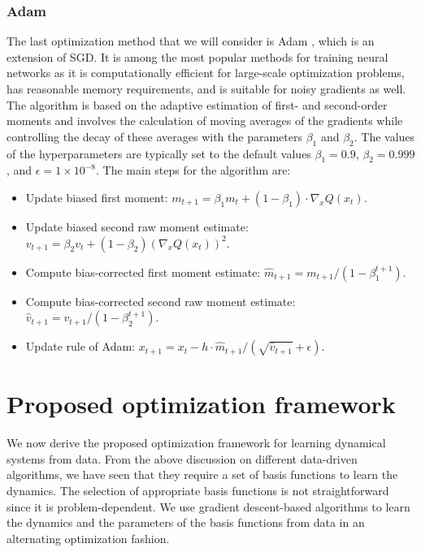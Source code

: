 \documentclass
[
    a4paper,
    DIV=11,
    abstract=true,
    11pt,
]
{scrartcl}
\theoremstyle{definition}
\begin{document}
\subsubsection{Adam}

The last optimization method that we will consider is Adam \cite{kingma2014adam}, which is an extension of SGD. It is among the most popular methods for training neural networks as it is computationally efficient for large-scale optimization problems, has reasonable memory requirements, and is suitable for noisy gradients as well. The algorithm is based on the adaptive estimation of first- and second-order moments and involves the calculation of moving averages of the gradients while controlling the decay of these averages with the parameters $\beta_1$ and $\beta_2$. The values of the hyperparameters are typically set to the default values $\beta_1 = 0.9$, $\beta_2 = 0.999$, and $\epsilon = 1\times 10^{-8}$. The main steps for the algorithm are:
\begin{itemize}
    \item Update biased first moment: $m_{t+1} = \beta_1 m_t + (1-\beta_1) \cdot \nabla_x Q(x_{t})$.
    \item Update biased second raw moment estimate: $v_{t+1} = \beta_2 v_t + (1-\beta_2) (\nabla_x Q(x_{t}))^2$.
    \item Compute bias-corrected first moment estimate: $\hat{m}_{t+1} = m_{t+1}/(1 - \beta_1^{t+1})$.
    \item Compute bias-corrected second raw moment estimate: $\hat{v}_{t+1} = v_{t+1}/(1 - \beta_2^{t+1})$.
    \item Update rule of Adam: $x_{t+1} = x_{t} - h \cdot \hat{m}_{t+1}/(\sqrt{\hat{v}_{t+1}} + \epsilon)$.
\end{itemize}

\section{Proposed optimization framework}
\label{sec:proposed_algos}

We now derive the proposed optimization framework for learning dynamical systems from data. From the above discussion on different data-driven algorithms, we have seen that they require a set of basis functions to learn the dynamics. The selection of appropriate basis functions is not straightforward since it is problem-dependent. We use gradient descent-based algorithms to learn the dynamics and the parameters of the basis functions from data in an alternating optimization fashion.
\end{document}
